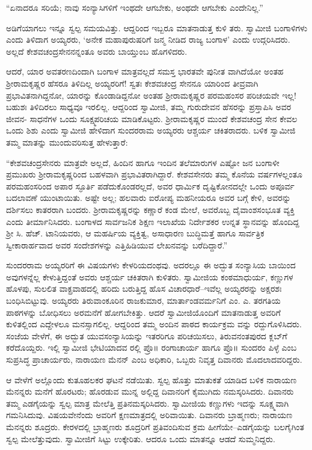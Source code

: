 “ಏನಾದರೂ ಸರಿಯೆ; ನಾವು ಸಂನ್ಯಾಸಿಗಳಿಗೆ ಇಂಥದೇ ಆಗಬೇಕು, ಅಂಥದೇ ಆಗಬೇಕು ಎಂದೇನಿಲ್ಲ.”

ಅಡಿಗೆಯಾಗಲು ಇನ್ನೂ ಸ್ವಲ್ಪ ಸಮಯವಿತ್ತು. ಆದ್ದರಿಂದ ಇಬ್ಬರೂ ಮಾತನಾಡುತ್ತ ಕುಳಿ ತರು. ಸ್ವಾಮೀಜಿ ಬಂಗಾಳಿಗಳು ಎಂದು ತಿಳಿದಾಗ ಅಯ್ಯರರು, ‘ಅನೇಕ ಮಹಾಪುರುಷರಿಗೆ ಜನ್ಮ ನೀಡಿದ ರಾಜ್ಯ ಬಂಗಾಳ’ ಎಂದು ಉದ್ಗರಿಸಿದರು. ಅಲ್ಲದೆ ಕೇಶವಚಂದ್ರಸೇನನನ್ನಂತೂ ಅವರು ಬಾಯ್ತುಂಬ ಹೊಗಳಿದರು.

ಆದರೆ, ಯಾರ ಅವತರಣದಿಂದಾಗಿ ಬಂಗಾಳ ಮಾತ್ರವಲ್ಲದೆ ಸಮಸ್ತ ಭಾರತವೇ ಪುನೀತ ವಾಗಿದೆಯೋ ಅಂತಹ ಶ್ರೀರಾಮಕೃಷ್ಣರ ಹೆಸರೂ ತಿಳಿದಿಲ್ಲ ಅಯ್ಯರರಿಗೆ! ಸ್ವತಃ ಕೇಶವಚಂದ್ರ ಸೇನನೂ ಯಾರಿಂದ ತೀವ್ರವಾಗಿ ಪ್ರಭಾವಿತನಾಗಿದ್ದನೋ, ಯಾರನ್ನು ಕೊಂಡಾಡಿದ್ದನೋ ಅಂತಹ ಶ್ರೀರಾಮಕೃಷ್ಣರ ಪರಮಹಂಸರ ಪರಿಚಯವೇ ಇಲ್ಲ! ಬಹುಶಃ ತಿಳಿದಿರಲು ಸಾಧ್ಯವೂ ಇರಲಿಲ್ಲ. ಆದ್ದರಿಂದ ಸ್ವಾಮೀಜಿ, ತಮ್ಮ ಗುರುದೇವನ ಹೆಸರನ್ನು ಪ್ರಸ್ತಾಪಿಸಿ ಅವರ ಜೀವನ- ಸಾಧನೆಗಳ ಒಂದು ಸೂಕ್ಷ್ಮಪರಿಚಯ ಮಾಡಿಕೊಟ್ಟರು. ಶ್ರೀರಾಮಕೃಷ್ಣರ ಮುಂದೆ ಕೇಶವಚಂದ್ರ ಸೇನ ಕೇವಲ ಒಂದು ಶಿಶು ಎಂದು ಸ್ವಾಮೀಜಿ ಹೇಳಿದಾಗ ಸುಂದರರಾಮ ಅಯ್ಯರರು ಆಶ್ಚರ್ಯ ಚಕಿತರಾದರು. ಬಳಿಕ ಸ್ವಾಮೀಜಿ ತಮ್ಮ ಮಾತನ್ನು ಮುಂದುವರಿಸುತ್ತ ಹೇಳುತ್ತಾರೆ:

“ಕೇಶವಚಂದ್ರಸೇನರು ಮಾತ್ರವೇ ಅಲ್ಲದೆ, ಹಿಂದಿನ ಹಾಗೂ ಇಂದಿನ ತಲೆಮಾರುಗಳ ಎಷ್ಟೋ ಜನ ಬಂಗಾಳೀ ಪ್ರಮುಖರು ಶ್ರೀರಾಮಕೃಷ್ಣರಿಂದ ಬಹಳವಾಗಿ ಪ್ರಭಾವಿತರಾಗಿದ್ದಾರೆ. ಕೇಶವಸೇನರು ತಮ್ಮ ಕೊನೆಯ ವರ್ಷಗಳಲ್ಲಂತೂ ಪರಮಹಂಸರಿಂದ ಅಪಾರ ಸ್ಫೂರ್ತಿ ಪಡೆದುಕೊಂಡರಲ್ಲದೆ, ಅವರ ಧಾರ್ಮಿಕ ದೃಷ್ಟಿಕೋನದಲ್ಲೇ ಒಂದು ಅಪೂರ್ವ ಬದಲಾವಣೆ ಯುಂಟಾಯಿತು. ಅಷ್ಟೇ ಅಲ್ಲ; ಹಲವಾರು ಐರೋಪ್ಯ ಮಹನೀಯರೂ ಅವರ ಬಗ್ಗೆ ಕೇಳಿ, ಅವರನ್ನು ದರ್ಶಿಸಲು ಕಾತರರಾಗಿ ಬಂದರು. ಶ್ರೀರಾಮಕೃಷ್ಣರನ್ನು ಕಣ್ಣಾರೆ ಕಂಡ ಮೇಲೆ, ಅವರೊಬ್ಬ ದೈವಾಂಶಸಂಭೂತ ವ್ಯಕ್ತಿ ಎಂದು ತೀರ್ಮಾನಿಸಿದರು. ಬಂಗಾಳದ ಸಾರ್ವಜನಿಕ ಶಿಕ್ಷಣ ಇಲಾಖೆಯ ನಿರ್ದೇಶಕರ ಉನ್ನತ ಸ್ಥಾನವನ್ನು ಹೊಂದಿದ್ದ ಶ್ರೀ ಸಿ. ಹೆಚ್. ಟಾನಿಯವರು, ಆ ಮಹರ್ಷಿಯ ವ್ಯಕ್ತಿತ್ವ, ಅಸಾಧಾರಣ ಬುದ್ಧಿಮತ್ತೆ ಹಾಗೂ ಸಾರ್ವತ್ರಿಕ ಸ್ವೀಕಾರಾರ್ಹವಾದ ಅವರ ಸಂದೇಶಗಳನ್ನು ಎತ್ತಿಹಿಡಿಯುವ ಲೇಖನವನ್ನು ಬರೆದಿದ್ದಾರೆ.”

ಸುಂದರರಾಮ ಅಯ್ಯರರಿಗೆ ಈ ವಿಷಯಗಳು ಕೇಳರಿಯದಂಥವು. ಅದರಲ್ಲೂ ಈ ಅದ್ಭುತ ಸಂನ್ಯಾಸಿಯ ಬಾಯಿಂದ ಅವುಗಳನ್ನೆಲ್ಲ ಕೇಳುತ್ತಿದ್ದಂತೆ ಅವರು ಆಶ್ಚರ್ಯ ಚಕಿತರಾಗಿ ಕುಳಿತರು. ಸ್ವಾಮೀಜಿಯ ಕಂಠಮಾಧುರ್ಯ, ಕಣ್ಣುಗಳ ಹೊಳಪು, ಸುಲಲಿತ ವಾಕ್ಪ್ರವಾಹದಲ್ಲಿ ಹರಿದು ಬರುತ್ತಿದ್ದ ಹೊಸ ವಿಚಾರಧಾರೆ–ಇವೆಲ್ಲ ಅಯ್ಯರರನ್ನು ಅಕ್ಷರಶಃ ಬಂಧಿಸಿಬಿಟ್ಟುವು. ಅಯ್ಯರರು ತಿರುವಾಂಕೂರಿನ ರಾಜಕುಮಾರ, ಮಾರ್ತಾಂಡವರ್ಮನಿಗೆ ಎಂ. ಎ. ತರಗತಿಯ ಪಾಠಗಳನ್ನು ಬೋಧಿಸಲು ಅರಮನೆಗೆ ಹೋಗಬೇಕಿತ್ತು. ಆದರೆ ಸ್ವಾಮೀಜಿಯೊಂದಿಗೆ ಮಾತನಾಡುತ್ತ ಅವರಿಗೆ ಕುಳಿತಲ್ಲಿಂದ ಎದ್ದೇಳಲೂ ಮನಸ್ಸಾಗಲಿಲ್ಲ. ಆದ್ದರಿಂದ ತಮ್ಮ ಅಂದಿನ ಪಾಠದ ಕಾರ್ಯಕ್ರಮ ವನ್ನು ರದ್ದುಗೊಳಿಸಿದರು. ಸಂಜೆಯ ವೇಳೆಗೆ, ಈ ಅದ್ಭುತ ಯುವಸಂನ್ಯಾಸಿಯನ್ನು ಇತರರಿಗೂ ಪರಿಚಯಿಸಲು, ತಿರುವನಂತಪುರದ ಕ್ಲಬ್​ಗೆ ಕರೆದೊಯ್ದರು. ಇಲ್ಲಿ ಸ್ವಾಮೀಜಿ ಭೇಟಿಯಾದವ ರಲ್ಲಿ ಪ್ರೊ॥ ರಂಗಾಚಾರ್ಯ ಹಾಗೂ ಪ್ರೊ॥ ಸುಂದರಂ ಪಿಳ್ಳೆ ಎಂಬ ಸುಪ್ರಸಿದ್ಧ ಪ್ರಾಚಾರ್ಯರು, ನಾರಾಯಣ ಮೆನನ್ ಎಂಬ ಅಧಿಕಾರಿ, ಒಬ್ಬರು ನಿವೃತ್ತ ದಿವಾನರು ಮೊದಲಾದವರಿದ್ದರು.

ಆ ವೇಳೆಗೆ ಅಲ್ಲೊಂದು ಕುತೂಹಲಕರ ಘಟನೆ ನಡೆಯಿತು. ಸ್ವಲ್ಪ ಹೊತ್ತು ಮಾತುಕತೆ ಯಾಡಿದ ಬಳಿಕ ನಾರಾಯಣ ಮೆನನ್ನರು ಮನೆಗೆ ಹೊರಟರು; ಹೊರಡುವ ಮುನ್ನ ಅಲ್ಲಿದ್ದ ದಿವಾನರಿಗೆ ಕೈಮುಗಿದು ನಮಸ್ಕರಿಸಿದರು. ದಿವಾನರು ತಮ್ಮ ಎಡಗೈಯನ್ನು ಸ್ವಲ್ಪ ಮಾತ್ರ ಮೇಲೆತ್ತಿ ಪ್ರತಿನಮಸ್ಕರಿಸಿದರು. ಸ್ವಾಮೀಜಿಯ ಕಣ್ಣುಗಳು ಇದನ್ನು ಸೂಕ್ಷ್ಮವಾಗಿ ಗಮನಿಸಿದುವು. ವಿಷಯವೇನೆಂದು ಅವರಿಗೆ ಕ್ಷಣಮಾತ್ರದಲ್ಲಿ ಅರಿವಾಯಿತು. ದಿವಾನರು ಬ್ರಾಹ್ಮಣರು; ನಾರಾಯಣ ಮೆನನ್ನರು ಶೂದ್ರರು. ಕೇರಳದಲ್ಲಿ ಬ್ರಾಹ್ಮಣರು ಶೂದ್ರರಿಗೆ ಪ್ರತಿವಂದಿಸುವ ಕ್ರಮ ಹೀಗೆಯೇ–ಎಡಗೈಯನ್ನು ಬಲಗೈಗಿಂತ ಸ್ವಲ್ಪ ಮೇಲೆತ್ತುವುದು. ಸ್ವಾಮೀಜಿಗೆ ಸಿಟ್ಟು ಉಕ್ಕೇರಿತು. ಆದರೂ ಒಂದು ಮಾತನ್ನೂ ಆಡದೆ ಸುಮ್ಮನಿದ್ದರು.


